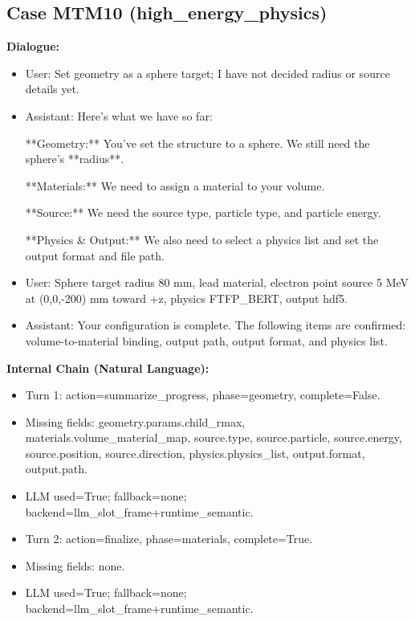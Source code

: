 \documentclass[11pt]{ctexart}
\begin{document}
\subsection{Case MTM10 (high\_energy\_physics)}
\textbf{Dialogue:}
\begin{itemize}
\item User: Set geometry as a sphere target; I have not decided radius or source details yet.
\item Assistant: Here's what we have so far:

**Geometry:** You've set the structure to a sphere. We still need the sphere's **radius**.

**Materials:** We need to assign a material to your volume.

**Source:** We need the source type, particle type, and particle energy.

**Physics \& Output:** We also need to select a physics list and set the output format and file path.
\item User: Sphere target radius 80 mm, lead material, electron point source 5 MeV at (0,0,-200) mm toward +z, physics FTFP\_BERT, output hdf5.
\item Assistant: Your configuration is complete. The following items are confirmed: volume-to-material binding, output path, output format, and physics list.
\end{itemize}
\textbf{Internal Chain (Natural Language):}
\begin{itemize}
\item Turn 1: action=summarize\_progress, phase=geometry, complete=False.
\item Missing fields: geometry.params.child\_rmax, materials.volume\_material\_map, source.type, source.particle, source.energy, source.position, source.direction, physics.physics\_list, output.format, output.path.
\item LLM used=True; fallback=none; backend=llm\_slot\_frame+runtime\_semantic.
\item Turn 2: action=finalize, phase=materials, complete=True.
\item Missing fields: none.
\item LLM used=True; fallback=none; backend=llm\_slot\_frame+runtime\_semantic.
\end{itemize}
\end{document}
